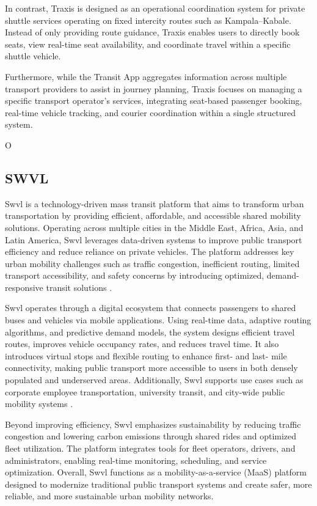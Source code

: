 In contrast, Traxis is designed as an operational coordination system for
private shuttle services operating on fixed intercity routes such as
Kampala–Kabale. Instead of only providing route guidance, Traxis enables users
to directly book seats, view real-time seat availability, and coordinate travel
within a specific shuttle vehicle.


Furthermore, while the Transit App aggregates information across multiple
transport providers to assist in journey planning, Traxis focuses on managing a
specific transport operator’s services, integrating seat-based passenger
booking, real-time vehicle tracking, and courier coordination within a single
structured system.


O

\subsection{SWVL}
Swvl is a technology-driven mass transit platform that aims to transform urban
transportation by providing efficient, affordable, and accessible shared
mobility solutions. Operating across multiple cities in the Middle East, Africa,
Asia, and Latin America, Swvl leverages data-driven systems to improve public
transport efficiency and reduce reliance on private vehicles. The platform
addresses key urban mobility challenges such as traffic congestion, inefficient
routing, limited transport accessibility, and safety concerns by introducing
optimized, demand-responsive transit solutions
\cite{SWVL2024HolidayInnSiemensBosch}.


Swvl operates through a digital ecosystem that connects passengers to shared
buses and vehicles via mobile applications. Using real-time data, adaptive
routing algorithms, and predictive demand models, the system designs efficient
travel routes, improves vehicle occupancy rates, and reduces travel time. It
also introduces virtual stops and flexible routing to enhance first- and last-
mile connectivity, making public transport more accessible to users in both
densely populated and underserved areas. Additionally, Swvl supports use cases
such as corporate employee transportation, university transit, and city-wide
public mobility systems \cite{narain2025swvlmobility}.


Beyond improving efficiency, Swvl emphasizes sustainability by reducing traffic
congestion and lowering carbon emissions through shared rides and optimized
fleet utilization. The platform integrates tools for fleet operators, drivers,
and administrators, enabling real-time monitoring, scheduling, and service
optimization. Overall, Swvl functions as a mobility-as-a-service (MaaS) platform
designed to modernize traditional public transport systems and create safer,
more reliable, and more sustainable urban mobility networks.


